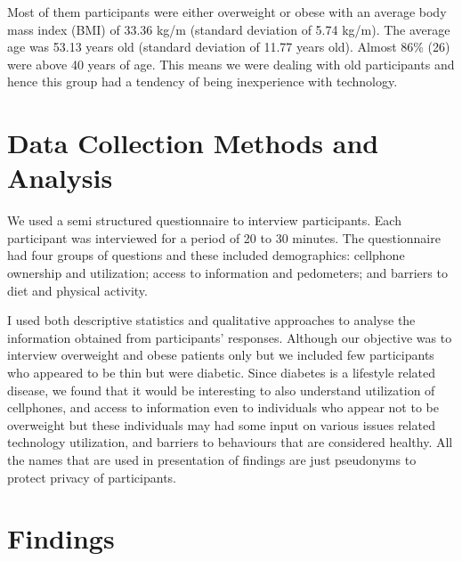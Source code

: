 Most of them participants were either overweight or obese with an average body mass index (BMI) of 33.36 kg/m (standard deviation of 5.74 kg/m). The average age was 53.13 years old (standard deviation of 11.77 years old).  Almost 86\% (26) were above 40 years of age. This means we were dealing with old participants and hence this group had a tendency of being inexperience with technology.

\section{Data Collection Methods and Analysis}
We used a semi structured questionnaire to interview participants. Each participant was interviewed for a period of 20 to 30 minutes. The questionnaire had four groups of questions and these included demographics: cellphone ownership and utilization; access to information and pedometers; and barriers to diet and physical activity. 

I used both descriptive statistics and qualitative approaches to analyse the information obtained from participants’ responses. Although our objective was to interview overweight and obese patients only but we included few participants who appeared to be thin but were diabetic. Since diabetes is a lifestyle related disease, we found that it would be interesting to also understand utilization of cellphones, and access to information even to individuals who appear not to be overweight but these individuals may had some input on various issues related technology utilization, and  barriers to behaviours that are considered healthy. All the names that are used in presentation of findings are just pseudonyms to protect privacy of participants. 
\section{Findings}
